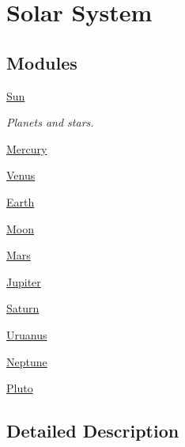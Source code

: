 \hypertarget{group___e_g_x_phys-_constants-_astrophysics-_solar_system}{}\section{Solar System}
\label{group___e_g_x_phys-_constants-_astrophysics-_solar_system}
\subsection*{Modules}
\begin{DoxyCompactItemize}
\item 
\mbox{\hyperlink{group___e_g_x_phys-_constants-_astrophysics-_solar_system-_sun}{Sun}}
\begin{DoxyCompactList}\small\item\em Planets and stars. \end{DoxyCompactList}\item 
\mbox{\hyperlink{group___e_g_x_phys-_constants-_astrophysics-_solar_system-_mercury}{Mercury}}
\item 
\mbox{\hyperlink{group___e_g_x_phys-_constants-_astrophysics-_solar_system-_venus}{Venus}}
\item 
\mbox{\hyperlink{group___e_g_x_phys-_constants-_astrophysics-_solar_system-_earth}{Earth}}
\item 
\mbox{\hyperlink{group___e_g_x_phys-_constants-_astrophysics-_solar_system-_moon}{Moon}}
\item 
\mbox{\hyperlink{group___e_g_x_phys-_constants-_astrophysics-_solar_system-_mars}{Mars}}
\item 
\mbox{\hyperlink{group___e_g_x_phys-_constants-_astrophysics-_solar_system-_jupiter}{Jupiter}}
\item 
\mbox{\hyperlink{group___e_g_x_phys-_constants-_astrophysics-_solar_system-_saturn}{Saturn}}
\item 
\mbox{\hyperlink{group___e_g_x_phys-_constants-_astrophysics-_solar_system-_uruanus}{Uruanus}}
\item 
\mbox{\hyperlink{group___e_g_x_phys-_constants-_astrophysics-_solar_system-_neptune}{Neptune}}
\item 
\mbox{\hyperlink{group___e_g_x_phys-_constants-_astrophysics-_solar_system-_pluto}{Pluto}}
\end{DoxyCompactItemize}


\subsection{Detailed Description}
